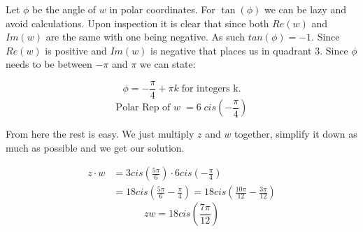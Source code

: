 \begin{solution}
        Let $\phi$ be the angle of $w$ in polar coordinates. For $\tan(\phi)$ we can be lazy and avoid calculations. Upon inspection it is clear that since both $Re(w)$ and $Im(w)$ are the same with one being negative. As such $tan(\phi) = -1$. Since $Re(w)$ is positive and $Im(w)$ is negative that places us in quadrant 3. Since $\phi$ needs to be between $-\pi$ and $\pi$ we can state: 
        
        \[\boxed{ \phi = -\frac{\pi}{4} + \pi k \; \text{for integers k.} }\]
        \[\boxed{ \text{Polar Rep of $w$} \; = 6 \; cis \left( -\frac{\pi}{4} \right) }\]
        
        From here the rest is easy. We just multiply $z$ and $w$ together, simplify it down as much as possible and we get our solution. 
        
        \begin{align}
            z \cdot w &= 3 cis \left( \frac{5\pi}{6} \right) \cdot 6 cis \left( -\frac{\pi}{4} \right) \\
            &= 18 cis \left( \frac{5\pi}{6} - \frac{\pi}{4} \right) = 18 cis \left( \frac{10\pi}{12} - \frac{3\pi}{12} \right)
        \end{align}
        \[\boxed{zw = 18 cis \left( \frac{7\pi}{12} \right) }\]
\end{solution}